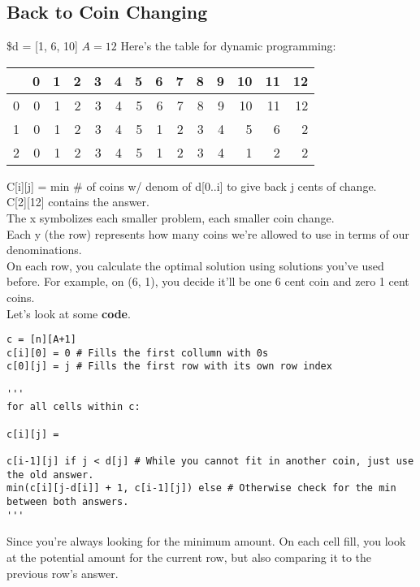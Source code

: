 \documentclass{article}
\begin{document}
\subsection{Back to Coin Changing}
\label{sec:orgbeb6c3d}
\$d = [1, 6, 10]
\(A = 12\)
Here's the table for dynamic programming:
\begin{center}
\begin{tabular}{rrrrrrrrrrrrrr}
 & 0 & 1 & 2 & 3 & 4 & 5 & 6 & 7 & 8 & 9 & 10 & 11 & 12\\
\hline
0 & 0 & 1 & 2 & 3 & 4 & 5 & 6 & 7 & 8 & 9 & 10 & 11 & 12\\
1 & 0 & 1 & 2 & 3 & 4 & 5 & 1 & 2 & 3 & 4 & 5 & 6 & 2\\
2 & 0 & 1 & 2 & 3 & 4 & 5 & 1 & 2 & 3 & 4 & 1 & 2 & 2\\
\end{tabular}
\end{center}
C[i][j] = min \# of coins w/ denom of d[0..i] to give back j cents of change. \\
C[2][12] contains the answer. \\
The x symbolizes each smaller problem, each smaller coin change. \\
Each y (the row) represents how many coins we're allowed to use in terms of our denominations. \\
On each row, you calculate the optimal solution using solutions you've used before. For example, on (6, 1), you decide it'll be one 6 cent coin and zero 1 cent coins. \\

Let's look at some \textbf{code}.

\begin{verbatim}
c = [n][A+1]
c[i][0] = 0 # Fills the first collumn with 0s
c[0][j] = j # Fills the first row with its own row index

'''
for all cells within c:

c[i][j] =

c[i-1][j] if j < d[j] # While you cannot fit in another coin, just use the old answer.
min(c[i][j-d[i]] + 1, c[i-1][j]) else # Otherwise check for the min between both answers.
'''
\end{verbatim}

Since you're always looking for the minimum amount. On each cell fill, you look at the potential amount for the current row, but also comparing it to the previous row's answer.
\end{document}
